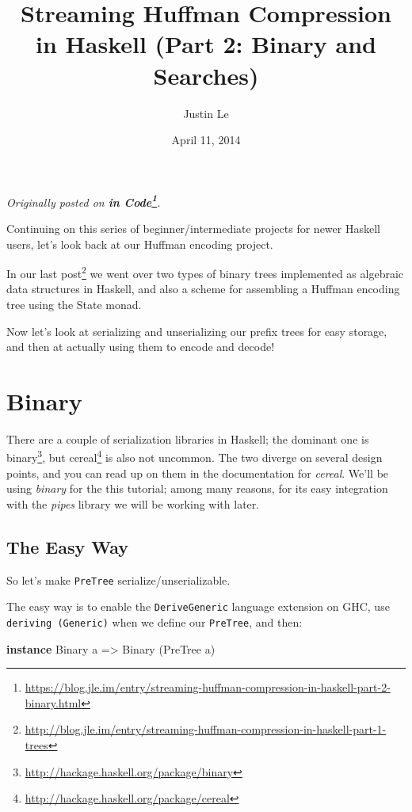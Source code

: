 \documentclass[]{article}
\title{Streaming Huffman Compression in Haskell (Part 2: Binary and Searches)}
\author{Justin Le}
\date{April 11, 2014}
\newenvironment{Shaded}{}{}
\newcommand{\KeywordTok}[1]{\textcolor[rgb]{0.00,0.44,0.13}{\textbf{{#1}}}}
\newcommand{\DataTypeTok}[1]{\textcolor[rgb]{0.56,0.13,0.00}{{#1}}}
\newcommand{\OtherTok}[1]{\textcolor[rgb]{0.00,0.44,0.13}{{#1}}}
\newcommand{\NormalTok}[1]{{#1}}
\renewcommand{\href}[2]{#2\footnote{\url{#1}}}
\begin{document}
\maketitle

\emph{Originally posted on
\textbf{\href{https://blog.jle.im/entry/streaming-huffman-compression-in-haskell-part-2-binary.html}{in
Code}}.}

Continuing on this series of beginner/intermediate projects for newer
Haskell users, let's look back at our Huffman encoding project.

In our
\href{http://blog.jle.im/entry/streaming-huffman-compression-in-haskell-part-1-trees}{last
post} we went over two types of binary trees implemented as algebraic
data structures in Haskell, and also a scheme for assembling a Huffman
encoding tree using the State monad.

Now let's look at serializing and unserializing our prefix trees for
easy storage, and then at actually using them to encode and decode!

\section{Binary}\label{binary}

There are a couple of serialization libraries in Haskell; the dominant
one is \href{http://hackage.haskell.org/package/binary}{binary}, but
\href{http://hackage.haskell.org/package/cereal}{cereal} is also not
uncommon. The two diverge on several design points, and you can read up
on them in the documentation for \emph{cereal}. We'll be using
\emph{binary} for the this tutorial; among many reasons, for its easy
integration with the \emph{pipes} library we will be working with later.

\subsection{The Easy Way}\label{the-easy-way}

So let's make \texttt{PreTree} serialize/unserializable.

The easy way is to enable the \texttt{DeriveGeneric} language extension
on GHC, use \texttt{deriving\ (Generic)} when we define our
\texttt{PreTree}, and then:

\begin{Shaded}
\begin{Highlighting}[]
\KeywordTok{instance} \DataTypeTok{Binary} \NormalTok{a }\OtherTok{=>} \DataTypeTok{Binary} \NormalTok{(}\DataTypeTok{PreTree} \NormalTok{a)}
\end{Highlighting}
\end{Shaded}
\end{document}
